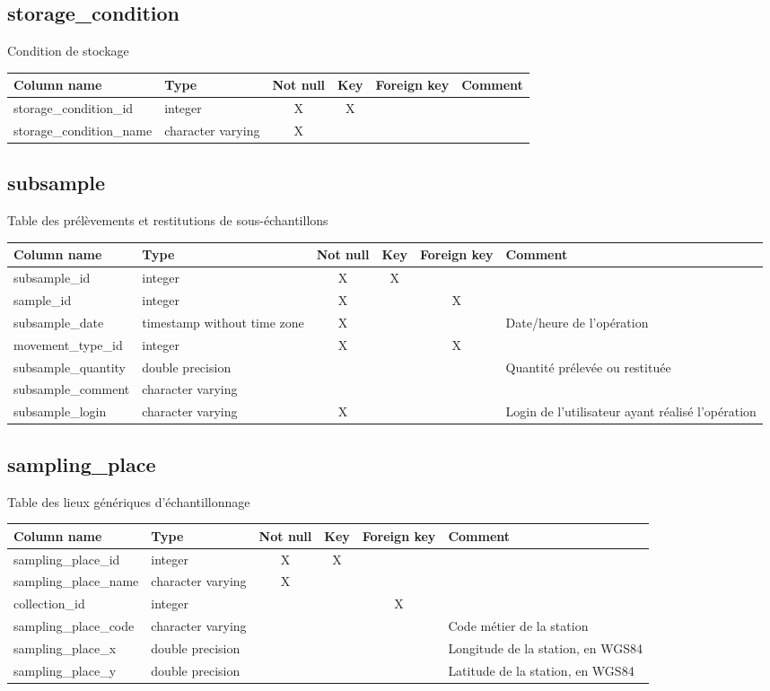 \subsection{storage\_condition}
Condition de stockage

\begin{tabular}{|l| p{2cm}|c|c|c| p{3cm}|}
\hline
Column name & Type & Not null & Key & Foreign key & Comment \\
\hline
storage\_condition\_id & integer & X & X & & \\
\hline
storage\_condition\_name & character varying & X & & & \\
\hline
\end{tabular}
\subsection{subsample}
Table des prélèvements et restitutions de sous-échantillons

\begin{tabular}{|l| p{2cm}|c|c|c| p{3cm}|}
\hline
Column name & Type & Not null & Key & Foreign key & Comment \\
\hline
subsample\_id & integer & X & X & & \\
\hline
sample\_id & integer & X & & X & \\
\hline
subsample\_date & timestamp without time zone & X & & & Date/heure de l'opération\\
\hline
movement\_type\_id & integer & X & & X & \\
\hline
subsample\_quantity & double precision & & & & Quantité prélevée ou restituée\\
\hline
subsample\_comment & character varying & & & & \\
\hline
subsample\_login & character varying & X & & & Login de l'utilisateur ayant réalisé l'opération\\
\hline
\end{tabular}
\subsection{sampling\_place}
Table des lieux génériques d'échantillonnage

\begin{tabular}{|l| p{2cm}|c|c|c| p{3cm}|}
\hline
Column name & Type & Not null & Key & Foreign key & Comment \\
\hline
sampling\_place\_id & integer & X & X & & \\
\hline
sampling\_place\_name & character varying & X & & & \\
\hline
collection\_id & integer & & & X & \\
\hline
sampling\_place\_code & character varying & & & & Code métier de la station\\
\hline
sampling\_place\_x & double precision & & & & Longitude de la station, en WGS84\\
\hline
sampling\_place\_y & double precision & & & & Latitude de la station, en WGS84\\
\hline
\end{tabular}

